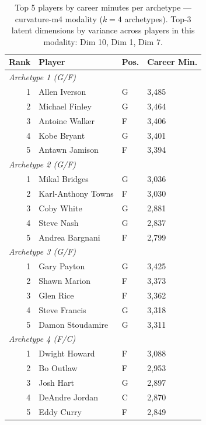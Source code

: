 \begin{table}[htbp]
  \centering\small
  \begin{tabular}{rlll}
    \toprule
    Rank & Player & Pos. & Career Min. \\
    \midrule
    \multicolumn{4}{l}{\textit{Archetype 1 (G/F)}} \\
    \midrule
    1 & Allen Iverson & G & 3,485 \\
    2 & Michael Finley & G & 3,464 \\
    3 & Antoine Walker & F & 3,406 \\
    4 & Kobe Bryant & G & 3,401 \\
    5 & Antawn Jamison & F & 3,394 \\
    \midrule[0.4pt]
    \multicolumn{4}{l}{\textit{Archetype 2 (G/F)}} \\
    \midrule
    1 & Mikal Bridges & G & 3,036 \\
    2 & Karl-Anthony Towns & F & 3,030 \\
    3 & Coby White & G & 2,881 \\
    4 & Steve Nash & G & 2,837 \\
    5 & Andrea Bargnani & F & 2,799 \\
    \midrule[0.4pt]
    \multicolumn{4}{l}{\textit{Archetype 3 (G/F)}} \\
    \midrule
    1 & Gary Payton & G & 3,425 \\
    2 & Shawn Marion & F & 3,373 \\
    3 & Glen Rice & F & 3,362 \\
    4 & Steve Francis & G & 3,318 \\
    5 & Damon Stoudamire & G & 3,311 \\
    \midrule[0.4pt]
    \multicolumn{4}{l}{\textit{Archetype 4 (F/C)}} \\
    \midrule
    1 & Dwight Howard & F & 3,088 \\
    2 & Bo Outlaw & F & 2,953 \\
    3 & Josh Hart & G & 2,897 \\
    4 & DeAndre Jordan & C & 2,870 \\
    5 & Eddy Curry & F & 2,849 \\
    \bottomrule
  \end{tabular}
  \caption{Top 5 players by career minutes per archetype --- curvature-m4 modality ($k=4$ archetypes). Top-3 latent dimensions by variance across players in this modality: Dim 10, Dim 1, Dim 7.}
  \label{tab:arch_reps_curvature_m4}
\end{table}


